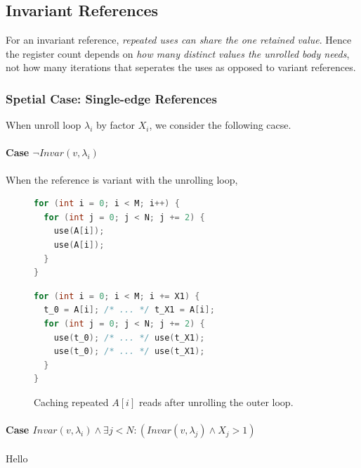 \subsection{Invariant References}
For an invariant reference, \textit{repeated uses can share the one retained 
value}. Hence the register count depends on \textit{how many distinct values the
unrolled body needs}, not how many iterations that seperates the uses as opposed
to variant references.

\subsubsection{Spetial Case: Single-edge References}
When unroll loop $\lambda_i$ by factor $X_i$, we consider the following cacse.

\paragraph{Case $\neg Invar(v, \lambda_i)$} When the reference is variant with
the unrolling loop, \todo{}
\begin{figure}[H]
  \centering
  \begin{minipage}[t]{0.48\textwidth}
\begin{lstlisting}[language=C, basicstyle=\ttfamily\scriptsize,
  aboveskip=2pt, belowskip=2pt,
  caption={Repeated reads of A with $j$ advanced by two},
  label={lst:ck94-reg-invar-variant-j-step-two}]
for (int i = 0; i < M; i++) {
  for (int j = 0; j < N; j += 2) {
    use(A[i]);
    use(A[i]);
  }
}
\end{lstlisting}
  \end{minipage}%
  \hfill
  \begin{minipage}[t]{0.48\textwidth}
\begin{lstlisting}[language=C, basicstyle=\ttfamily\scriptsize,
  aboveskip=2pt, belowskip=2pt,
  caption={Cached reads of A after unrolling $i$},
  label={lst:ck94-reg-invar-variant-i-unrolled-cached}]
for (int i = 0; i < M; i += X1) {
  t_0 = A[i]; /* ... */ t_X1 = A[i];
  for (int j = 0; j < N; j += 2) {
    use(t_0); /* ... */ use(t_X1);
    use(t_0); /* ... */ use(t_X1);
  }
}
\end{lstlisting}
  \end{minipage}
  \caption{Caching repeated $A[i]$ reads after unrolling the outer loop.}
  \label{fig:ck94-reg-invar-variant}
\end{figure}

\paragraph{Case $Invar(v, \lambda_i) \land 
\exists j < N: \left(Invar(v, \lambda_j) \land X_{j} > 1\right)$} Hello

